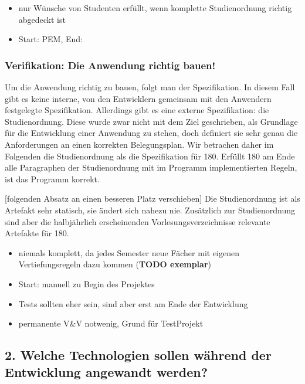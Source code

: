 \documentclass[ngerman]{article}
\begin{document}
\begin{itemize}
\itemsep1pt\parskip0pt
\item
  nur Wünsche von Studenten erfüllt, wenn komplette Studienordnung
  richtig abgedeckt ist
\item
  Start: PEM, End:
\end{itemize}

\subsubsection{Verifikation: Die Anwendung richtig
bauen!}\label{verifikation-die-anwendung-richtig-bauen}

Um die Anwendung richtig zu bauen, folgt man der Spezifikation. In
diesem Fall gibt es keine interne, von den Entwicklern gemeinsam mit den
Anwendern festgelegte Spezifikation. Allerdings gibt es eine externe
Spezifikation: die Studienordnung. Diese wurde zwar nicht mit dem Ziel
geschrieben, als Grundlage für die Entwicklung einer Anwendung zu
stehen, doch definiert sie sehr genau die Anforderungen an einen
korrekten Belegungsplan. Wir betrachen daher im Folgenden die
Studienordnung als die Spezifikation für 180. Erfüllt 180 am Ende alle
Paragraphen der Studienordnung mit im Programm implementierten Regeln,
ist das Programm korrekt.

{[}folgenden Absatz an einen besseren Platz verschieben{]} Die
Studienordnung ist als Artefakt sehr statisch, sie ändert sich nahezu
nie. Zusätzlich zur Studienordnung sind aber die halbjährlich
erscheinenden Vorlesungsverzeichnisse relevante Artefakte für 180.

\begin{itemize}
\item
  niemals komplett, da jedes Semester neue Fächer mit eigenen
  Vertiefungsregeln dazu kommen (\textbf{TODO exemplar})
\item
  Start: manuell zu Begin des Projektes
\item
  Tests sollten eher sein, sind aber erst am Ende der Entwicklung
\item
  permanente V\&V notwenig, Grund für TestProjekt
\end{itemize}

\subsection{2. Welche Technologien sollen während der Entwicklung
angewandt
werden?}\label{welche-technologien-sollen-wuxe4hrend-der-entwicklung-angewandt-werden}
\end{document}
